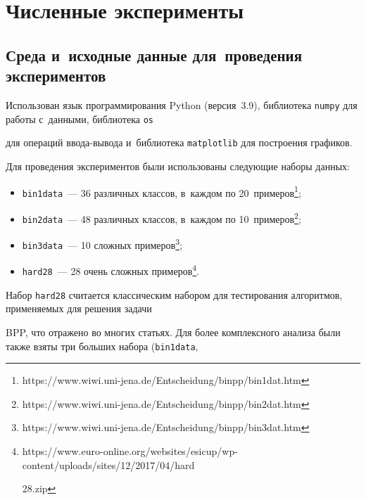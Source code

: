 \section{Численные эксперименты}



\subsection{Среда и~исходные данные для~проведения экспериментов}



Использован язык программирования Python (версия~3.9), биб\-лио\-те\-ка \texttt{numpy} для работы с~данными, биб\-лио\-те\-ка \texttt{os} 

для операций вво\-да-вы\-во\-да и~биб\-лио\-те\-ка \texttt{matplotlib} для по\-стро\-ения гра\-фи\-ков.



    Для проведения экспериментов были использованы сле\-ду\-ющие наборы данных:

    \begin{itemize}

        \item \texttt{bin1data}\ --- 36 различных классов, в~каж\-дом по 20~примеров\footnote{{\sf https://www.wiwi.uni-jena.de/Entscheidung/binpp/bin1dat.htm}};

        \item \texttt{bin2data}\ --- 48 различных классов, в~каж\-дом по 10~примеров\footnote{{\sf https://www.wiwi.uni-jena.de/Entscheidung/binpp/bin2dat.htm}};

        \item \texttt{bin3data}\ --- 10 сложных примеров\footnote{{\sf https://www.wiwi.uni-jena.de/Entscheidung/binpp/bin3dat.htm}};

        \item \texttt{hard28}\ --- 28 очень слож\-ных примеров\footnote{{\sf https://www.euro-online.org/websites/esicup/wp-content/uploads/sites/12/2017/04/hard}\linebreak

        {\sf 28.zip}}.

    \end{itemize}



    Набор \texttt{hard28} считается классическим набором для тес\-ти\-ро\-ва\-ния алгоритмов, при\-ме\-ня\-емых для решения задачи 

    BPP, что отражено во многих стать\-ях. Для более комплексного анализа были так\-же взяты три больших набора (\texttt{bin1data}, 

